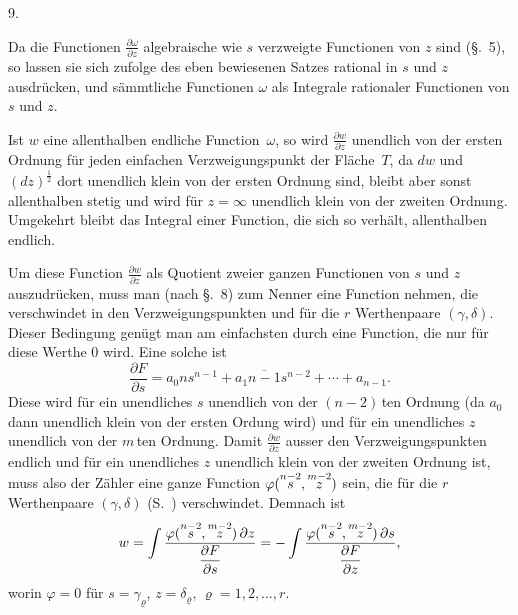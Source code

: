 \documentclass[a4paper,12pt,leqno]{article}
\begin{document}
\medbreak

\centerline{9.}

\nobreak\medskip

Da die Functionen
$\displaystyle \frac{\partial \omega}{\partial z}$
algebraische wie $s$ verzweigte Functionen von $z$ sind (\S.~5),
so lassen sie sich zufolge des eben bewiesenen Satzes rational in
$s$ und $z$ ausdr\"{u}cken, und s\"{a}mmtliche Functionen
$\omega$ als Integrale rationaler Functionen von $s$ und $z$.

Ist $w$ eine allenthalben endliche Function~$\omega$, so wird
$\displaystyle \frac{\partial w}{\partial z}$
unendlich von der ersten Ordnung f\"{u}r jeden einfachen
Verzweigungspunkt der Fl\"{a}che~$T$, da $dw$ und
$(dz)^{\frac{1}{2}}$ dort unendlich klein von der ersten Ordnung
sind, bleibt aber sonst allenthalben stetig und wird f\"{u}r
$z = \infty$ unendlich klein von der zweiten Ordnung.  Umgekehrt
bleibt das Integral einer Function, die sich so verh\"{a}lt,
allenthalben endlich.

Um diese Function
$\displaystyle \frac{\partial w}{\partial z}$
als Quotient zweier ganzen Functionen von $s$ und $z$
auszudr\"{u}cken, muss man (nach \S.~8) zum Nenner eine Function
nehmen, die verschwindet in den Verzweigungspunkten und f\"{u}r
die $r$ Werthenpaare $(\gamma, \delta)$.  Dieser Bedingung
gen\"{u}gt man am einfachsten durch eine Function, die nur
f\"{u}r diese Werthe $0$ wird.  Eine solche ist
\[ \frac{\partial F}{\partial s}
   = a_0 n s^{n-1} + a_1 \overline{n - 1} s^{n-2} + \cdots + a_{n-1}.\]
Diese wird f\"{u}r ein unendliches $s$ unendlich von der
${(n - 2)} \,$\-ten Ordnung (da $a_0$ dann unendlich klein von der
ersten Ordung wird) und f\"{u}r ein unendliches $z$ unendlich von
der $m \,$\-ten Ordnung.  Damit
$\displaystyle \frac{\partial w}{\partial z}$
ausser den Verzweigungspunkten endlich und f\"{u}r ein unendliches
$z$ unendlich klein von der zweiten Ordnung ist, muss also der
Z\"{a}hler eine ganze Function
$\varphi( {\buildrel n - 2 \over s}, {\buildrel m - 2 \over z} )$
sein, die f\"{u}r die $r$ Werthenpaare $(\gamma, \delta)$
(S.~\pageref{`Werthenpaare'}) verschwindet.  Demnach ist
\[ w = \int
   \frac{\varphi( {\buildrel n - 2 \over s}, {\buildrel m - 2 \over z} )
   \, \partial z}{\displaystyle\frac{\partial F}{\partial s}}
   = - \int
   \frac{\varphi( {\buildrel n - 2 \over s}, {\buildrel m - 2 \over z} )
   \, \partial s}{\displaystyle\frac{\partial F}{\partial z}},\]
worin $\varphi = 0$ f\"{u}r
$s = \gamma_\varrho$, $z = \delta_\varrho$,
$\varrho = 1,2,\ldots, r$.
\end{document}
